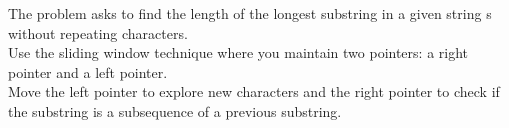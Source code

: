 \documentclass[preview]{standalone}
\begin{document}
The problem asks to find the length of the longest substring in a given string s without repeating characters.\\Use the sliding window technique where you maintain two pointers: a right pointer and a left pointer.\\Move the left pointer to explore new characters and the right pointer to check if the substring is a subsequence of a previous substring.\\
\end{document}
